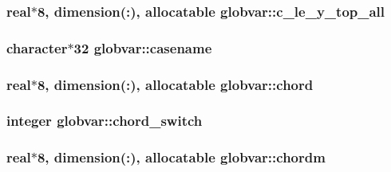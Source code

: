 \subsubsection[{c\+\_\+le\+\_\+y\+\_\+top\+\_\+all}]{\setlength{\rightskip}{0pt plus 5cm}real$\ast$8, dimension(\+:), allocatable globvar\+::c\+\_\+le\+\_\+y\+\_\+top\+\_\+all}\label{namespaceglobvar_a3675f2363320e97186b54bdf83c57fe0}
\hypertarget{namespaceglobvar_a0a6c526cbc0a41ebd6f3667a0a9183ba}{}
\subsubsection[{casename}]{\setlength{\rightskip}{0pt plus 5cm}character$\ast$32 globvar\+::casename}\label{namespaceglobvar_a0a6c526cbc0a41ebd6f3667a0a9183ba}
\hypertarget{namespaceglobvar_a7b5f7850dbc4bf45b1c0477fe23101fd}{}
\subsubsection[{chord}]{\setlength{\rightskip}{0pt plus 5cm}real$\ast$8, dimension(\+:), allocatable globvar\+::chord}\label{namespaceglobvar_a7b5f7850dbc4bf45b1c0477fe23101fd}
\hypertarget{namespaceglobvar_a43852fe59e4847373e97ec738fcd12cf}{}
\subsubsection[{chord\+\_\+switch}]{\setlength{\rightskip}{0pt plus 5cm}integer globvar\+::chord\+\_\+switch}\label{namespaceglobvar_a43852fe59e4847373e97ec738fcd12cf}
\hypertarget{namespaceglobvar_aea4b21a5810c0b0a15759b11536d0a7e}{}
\subsubsection[{chordm}]{\setlength{\rightskip}{0pt plus 5cm}real$\ast$8, dimension(\+:), allocatable globvar\+::chordm}\label{namespaceglobvar_aea4b21a5810c0b0a15759b11536d0a7e}
\hypertarget{namespaceglobvar_a0af19e0c5bd151072f235940d7e08b48}{}
